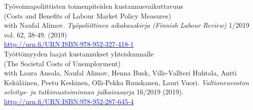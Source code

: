\documentclass[16pt]{article}
\begin{document}
\noindent Ty\"{o}voimapoliittisten toimenpiteiden kustannusvaikuttavuus \\
\noindent (Costs and Benefits of Labour Market Policy Measures) \\
\noindent with Naufal Alimov. \textit{Ty\"{o}poliittinen aikakauskirja (Finnish Labour Review)} 1/2019 vol. 62, 38-49.  (2019) \\
\noindent \href{http://urn.fi/URN:ISBN:978-952-287-645-4}{\textcolor{blue}{http://urn.fi/URN:ISBN:978-952-327-418-1}} \\

\noindent Ty\"{o}tt\"{o}myyden laajat kustannukset yhteiskunnalle \\
\noindent (The Societal Costs of Unemployment) \\
\noindent with Laura Ansala, Naufal Alimov, Henna Busk, Ville-Vallteri Huhtala, Antti Kek\"{a}l\"{a}inen, Peetu Keskinen, Olli-Pekka Ruuskanen, Lauri Vuori.  \textit{Valtioneuvoston selvitys- ja tutkimustoiminnan julkaisusarja} 16/2019 (2019).  \\
\noindent \href{http://urn.fi/URN:ISBN:978-952-287-645-4}{\textcolor{blue}{http://urn.fi/URN:ISBN:978-952-287-645-4}} \\




%
%
%
\end{document}

